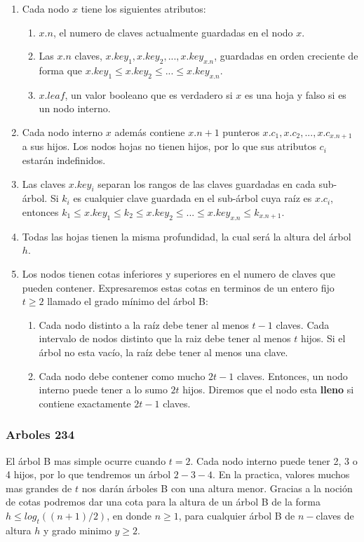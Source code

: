 \documentclass[10pt, a4paper]{report}
\begin{document}
\begin{enumerate}
 \item Cada nodo $x$ tiene los siguientes atributos:
 \begin{enumerate}
  \item $x.n$, el numero de claves actualmente guardadas en el nodo $x$.
  \item Las $x.n$ claves, $x.key_1, x.key_2, ..., x.key_{x.n}$, guardadas en orden creciente de forma que $x.key_1\leq x.key_2\leq ...\leq x.key_{x.n}$.
  \item $x.leaf$, un valor booleano que es verdadero si $x$ es una hoja y falso si es un nodo interno.
 \end{enumerate}
 \item Cada nodo interno $x$ adem\'as contiene $x.n+1$ punteros $x.c_1,x.c_2,...,x.c_{x.n+1}$ a sus hijos. Los nodos hojas no tienen hijos, por lo que sus atributos $c_i$ estar\'an indefinidos.
 \item Las claves $x.key_i$ separan los rangos de las claves guardadas en cada sub-\'arbol. Si $k_i$ es cualquier clave guardada en el sub-\'arbol cuya ra\'iz es $x.c_i$, entonces $k_1 \leq x.key_1 \leq k_2 \leq x.key_2 \leq ... \leq x.key_{x.n} \leq k_{x.n+1}$.
 \item Todas las hojas tienen la misma profundidad, la cual ser\'a la altura del \'arbol $h$.
 \item Los nodos tienen cotas inferiores y superiores en el numero de claves que pueden contener. Expresaremos estas cotas en terminos de un entero fijo $t \geq 2$ llamado el grado m\'inimo del \'arbol B:
 \begin{enumerate}
  \item Cada nodo distinto a la ra\'iz debe tener al menos $t-1$ claves. Cada intervalo de nodos distinto que la raiz debe tener al menos $t$ hijos. Si el \'arbol no esta vac\'io, la ra\'iz debe tener al menos una clave.
  \item Cada nodo debe contener como mucho $2t-1$ claves. Entonces, un nodo interno puede tener a lo sumo $2t$ hijos. Diremos que el nodo esta \textbf{lleno} si contiene exactamente $2t - 1$ claves.
 \end{enumerate}
\end{enumerate}

\subsubsection{Arboles 234}
El \'arbol B mas simple ocurre cuando $t=2$. Cada nodo interno puede tener 2, 3 o 4 hijos, por lo que tendremos un \'arbol $2-3-4$. En la practica, valores muchos mas grandes de $t$ nos dar\'an \'arboles B con una altura menor. Gracias a la noci\'on de cotas podremos dar una cota para la altura de un \'arbol B de la forma $h \leq log_t((n+1)/2)$, en donde $n \geq 1$, para cualquier \'arbol B de $n-$claves de altura $h$ y grado minimo $y \geq 2$.
\end{document}
